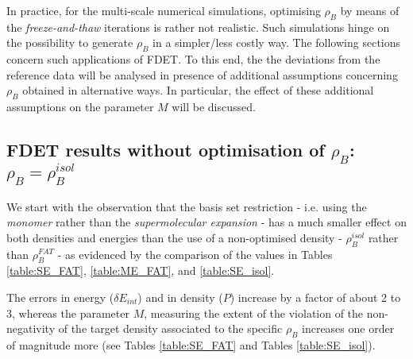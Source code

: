 \documentclass[amsmath,amssymb,preprint,aip,jcp]{revtex4-1}
\newcommand{\nr}[1]{\color{red}#1\color{black}}
\begin{document}
In practice, for the multi-scale numerical simulations,  optimising 
$\rho_B$ by means of the {\it freeze-and-thaw} iterations is rather not realistic. Such simulations hinge on the possibility to generate $\rho_B$ 
in a simpler/less costly way. 
The \nr{following } sections concern such applications of FDET. 
To this end, the the deviations from the reference data will be analysed in presence of additional assumptions concerning $\rho_B$ obtained in alternative ways. In particular, the effect of these additional assumptions on the parameter $M$ will be discussed.
\subsection{FDET results without optimisation of $\rho_B$: $\rho_B=\rho_B^{isol}$}
\nr{We start with the observation that the basis set restriction - i.e. using the {\it monomer} rather than the {\it supermolecular expansion} - has a much smaller effect on both densities and energies than the use of a non-optimised density - $\rho_B^{isol}$ rather than $\rho_B^{FAT}$ - as evidenced by the comparison of the values in Tables \ref{table:SE_FAT},  \ref{table:ME_FAT}, and \ref{table:SE_isol}}.

The errors in energy ($\delta E_{int}$) and in density ($P$) increase   by a factor of about 2 to 3, whereas \nr{the parameter } $M$, measuring the exten\nr{t } of the violation of the non-negativity of the target density \nr{associated to the specific } $\rho_B$ increases  one order of magnitude more (see Tables \ref{table:SE_FAT} and Tables \ref{table:SE_isol}). 
\end{document}
